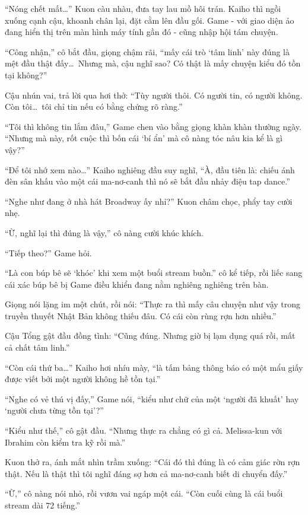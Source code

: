 \documentclass[../main.tex]{subfiles}
\begin{document}
``Nóng chết mất\dots'' Kuon càu nhàu, đưa tay lau mồ hôi trán. Kaiho thì ngồi xuống cạnh cậu, khoanh chân lại, đặt cằm lên đầu gối. Game - với giao diện ảo đang hiển thị trên màn hình máy tính gần đó - cũng nhập hội tám chuyện.

``Công nhận,'' cô bắt đầu, giọng chậm rãi, ``mấy cái trò `tâm linh' này đúng là mệt đầu thật đấy\dots\ Nhưng mà, cậu nghĩ sao? Có thật là mấy chuyện kiểu đó tồn tại không?''

Cậu nhún vai, trả lời qua hơi thở: ``Tùy người thôi. Có người tin, có người không. Còn tôi\dots\ tôi chỉ tin nếu có bằng chứng rõ ràng.''

``Tôi thì không tin lắm đâu,'' Game chen vào bằng giọng khàn khàn thường ngày. ``Nhưng mà này, rốt cuộc thì bốn cái `bí ẩn' mà cô nàng tóc nâu kia kể là gì vậy?''

``Để tôi nhớ xem nào\dots'' Kaiho nghiêng đầu suy nghĩ, ``À, đầu tiên là: chiếu ánh đèn sân khấu vào một cái ma-nơ-canh thì nó sẽ bắt đầu nhảy điệu tap dance.''

``Nghe như đang ở nhà hát Broadway ấy nhỉ?'' Kuon châm chọc, phẩy tay cười nhẹ.

``Ừ, nghĩ lại thì đúng là vậy,'' cô nàng cười khúc khích.

``Tiếp theo?'' Game hỏi.

``Là con búp bê sẽ `khóc' khi xem một buổi stream buồn.'' cô kể tiếp, rồi liếc sang cái xác búp bê bị Game điều khiển đang nằm nghiêng nghiêng trên bàn.

Giọng nói lặng im một chút, rồi nói: ``Thực ra thì mấy câu chuyện như vậy trong truyền thuyết Nhật Bản không thiếu đâu. Có cái còn rùng rợn hơn nhiều.''

Cậu Tổng gật đầu đồng tình: ``Cũng đúng. Nhưng giờ bị lạm dụng quá rồi, mất cả chất tâm linh.''

``Còn cái thứ ba\dots'' Kaiho hơi nhíu mày, ``là tấm bảng thông báo có một mẩu giấy được viết bởi một người không hề tồn tại.''

``Nghe có vẻ thú vị đấy,'' Game nói, ``kiểu như chữ của một `người đã khuất' hay `người chưa từng tồn tại'?''

``Kiểu như thế,'' cô gật đầu. ``Nhưng thực ra chẳng có gì cả. Melissa-kun với Ibrahim còn kiểm tra kỹ rồi mà.''

Kuon thở ra, ánh mắt nhìn trầm xuống: ``Cái đó thì đúng là có cảm giác rờn rợn thật. Nếu là thật thì tôi nghĩ đáng sợ hơn cả ma-nơ-canh biết di chuyển đấy.''

``Ừ,'' cô nàng nói nhỏ, rồi vươn vai ngáp một cái. ``Còn cuối cùng là cái buổi stream dài 72 tiếng.''
\end{document}
